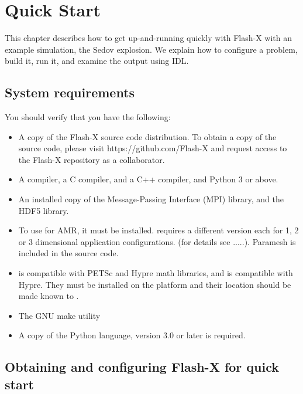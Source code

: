 
\chapter{Quick Start}
\label{Chp:Quickstart}

This chapter describes how to get up-and-running quickly with Flash-X
with an example simulation, the Sedov explosion.  We explain
how to configure a problem, build it, run it, and examine the output
using IDL.

\section{System requirements}

You should verify that you have the following:

\begin{itemize}

\item A copy of the Flash-X source code distribution. To obtain a copy
  of the source code, please visit https://github.com/Flash-X and
  request access to the Flash-X repository as a collaborator. 

\item A \Fortran compiler, a C compiler, and a C++ compiler, and
  Python 3 or above. 

\item An installed copy of the Message-Passing Interface (MPI)
  library, and the HDF5 library.

  \item To use \amrex for AMR, it must be installed. \amrex requires a
    different version each for 1, 2 or 3 dimensional application
    configurations. 
    (for details see .....). Paramesh is included in the source code.

\item \amrex is compatible with PETSc and Hypre math libraries, and
  \paramesh is compatible with Hypre. They must be installed on the
  platform and their location should be made known to \amrex. 

\item The GNU make utility

\item A copy of the Python language, version 3.0 or later is
  required.
  
\end{itemize}


\section{Obtaining and configuring Flash-X for quick start}
\label{unpack}

